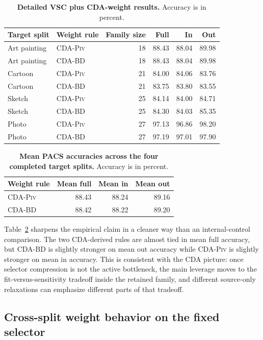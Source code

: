 \documentclass{article}
\theoremstyle{definition}
\newcommand{\piv}{\textup{\textsc{CDA-Piv}}}
\newcommand{\bd}{\textup{\textsc{CDA-BD}}}
\begin{document}
\begin{table}[t]
\centering
\caption{\textbf{Detailed VSC plus CDA-weight results.} Accuracy is in percent.}
\label{tab:full_in_out}
\begin{tabular}{llrrrr}
\toprule
Target split & Weight rule & Family size & Full & In & Out \\
\midrule
Art painting & \piv{} & 18 & 88.43 & 88.04 & 89.98 \\
Art painting & \bd{}  & 18 & 88.43 & 88.04 & 89.98 \\
Cartoon      & \piv{} & 21 & 84.00 & 84.06 & 83.76 \\
Cartoon      & \bd{}  & 21 & 83.75 & 83.80 & 83.55 \\
Sketch       & \piv{} & 25 & 84.14 & 84.00 & 84.71 \\
Sketch       & \bd{}  & 25 & 84.30 & 84.03 & 85.35 \\
Photo        & \piv{} & 27 & 97.13 & 96.86 & 98.20 \\
Photo        & \bd{}  & 27 & 97.19 & 97.01 & 97.90 \\
\bottomrule
\end{tabular}
\end{table}

\begin{table}[t]
\centering
\caption{\textbf{Mean PACS accuracies across the four completed target splits.} Accuracy is in percent.}
\label{tab:mean_metrics}
\begin{tabular}{lrrr}
\toprule
Weight rule & Mean full & Mean in & Mean out \\
\midrule
\piv{} & 88.43 & 88.24 & 89.16 \\
\bd{} & 88.42 & 88.22 & 89.20 \\
\bottomrule
\end{tabular}
\end{table}

Table~\ref{tab:mean_metrics} sharpens the empirical claim in a cleaner way than an internal-control comparison. The two CDA-derived rules are almost tied in mean full accuracy, but \bd{} is slightly stronger on mean out accuracy while \piv{} is slightly stronger on mean in accuracy. This is consistent with the CDA picture: once selector compression is not the active bottleneck, the main leverage moves to the fit-versus-sensitivity tradeoff inside the retained family, and different source-only relaxations can emphasize different parts of that tradeoff.

\subsection{Cross-split weight behavior on the fixed selector}
\end{document}
